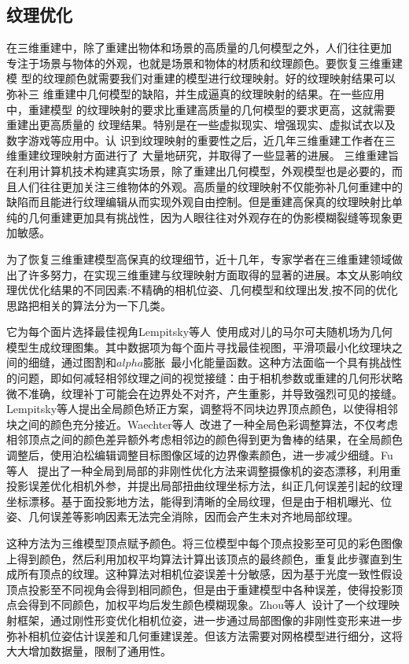 \subsection{纹理优化}
在三维重建中，除了重建出物体和场景的高质量的几何模型之外，人们往往更加 专注于场景与物体的外观，也就是场景和物体的材质和纹理颜色。要恢复三维重建模 型的纹理颜色就需要我们对重建的模型进行纹理映射。好的纹理映射结果可以弥补三 维重建中几何模型的缺陷，并生成逼真的纹理映射的结果。在一些应用中，重建模型 的纹理映射的要求比重建高质量的几何模型的要求更高，这就需要重建出更高质量的 纹理结果。特别是在一些虚拟现实、增强现实、虚拟试衣以及数字游戏等应用中。认 识到纹理映射的重要性之后，近几年三维重建工作者在三维重建纹理映射方面进行了 大量地研究，并取得了一些显著的进展。
三维重建旨在利用计算机技术构建真实场景，除了重建出几何模型，外观模型也是必要的，而且人们往往更加关注三维物体的外观。高质量的纹理映射不仅能弥补几何重建中的缺陷而且能进行纹理编辑从而实现外观自由控制。但是重建高保真的纹理映射比单纯的几何重建更加具有挑战性，因为人眼往往对外观存在的伪影模糊裂缝等现象更加敏感。 \par
为了恢复三维重建模型高保真的纹理细节，近十几年，专家学者在三维重建领域做出了许多努力，在实现三维重建与纹理映射方面取得的显著的进展。本文从影响纹理优优化结果的不同因素:不精确的相机位姿、几何模型和纹理出发,按不同的优化思路把相关的算法分为一下几类。\par
\vspace*{2mm}它为每个面片选择最佳视角Lempitsky等人~\cite{lempitsky2007seamless}使用成对儿的马尔可夫随机场为几何模型生成纹理图集。其中数据项为每个面片寻找最佳视图，平滑项最小化纹理块之间的细缝，通过图割和$alpha$膨胀~\cite{boykov2001fast}最小化能量函数。这种方法面临一个具有挑战性的问题，即如何减轻相邻纹理之间的视觉接缝：由于相机参数或重建的几何形状略微不准确，纹理补丁可能会在边界处不对齐，产生重影，并导致强烈可见的接缝。Lempitsky等人提出全局颜色矫正方案，调整将不同块边界顶点颜色，以使得相邻块之间的颜色充分接近。Waechter等人~\cite{waechter2014let}改进了一种全局色彩调整算法，不仅考虑相邻顶点之间的颜色差异额外考虑相邻边的颜色得到更为鲁棒的结果，在全局颜色调整后，使用泊松编辑调整目标图像区域的边界像素颜色，进一步减少细缝。Fu等人~\cite{fu2018texture} 提出了一种全局到局部的非刚性优化方法来调整摄像机的姿态漂移，利用重投影误差优化相机外参，并提出局部扭曲纹理坐标方法，纠正几何误差引起的纹理坐标漂移。基于面投影地方法，能得到清晰的全局纹理，但是由于相机曝光、位姿、几何误差等影响因素无法完全消除，因而会产生未对齐地局部纹理。\par
\vspace*{2mm}这种方法为三维模型顶点赋予颜色。将三位模型中每个顶点投影至可见的彩色图像上得到颜色，然后利用加权平均算法计算出该顶点的最终颜色，重复此步骤直到生成所有顶点的纹理。这种算法对相机位姿误差十分敏感，因为基于光度一致性假设顶点投影至不同视角会得到相同颜色，但是由于重建模型中各种误差，使得投影顶点会得到不同颜色，加权平均后发生颜色模糊现象。Zhou等人~\cite{zhou2014color}设计了一个纹理映射框架，通过刚性形变优化相机位姿，进一步通过局部图像的非刚性变形来进一步弥补相机位姿估计误差和几何重建误差。但该方法需要对网格模型进行细分，这将大大增加数据量，限制了通用性。\par
